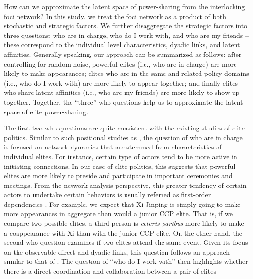 \documentclass[11pt,english]{article}
\begin{document}
\begin{flushleft}
How can we approximate the latent space of power-sharing from the interlocking foci network? In this study, we treat the foci network as a product of both stochastic and strategic factors. We further disaggregate the strategic factors into three questions: who are in charge, who do I work with, and who are my friends -- these correspond to the individual level characteristics, dyadic links, and latent affinities. Generally speaking, our approach can be summarized as follows: after controlling for random noise, powerful elites (i.e., who are in charge) are more likely to make appearances; elites who are in the same and related policy domains (i.e., who do I work with) are more likely to appear together; and finally elites who share latent affinities (i.e., who are my friends) are more likely to show up together. Together, the ``three'' who questions help us to approximate the latent space of elite power-sharing.

The first two who questions are quite consistent with the existing studies of elite politics. Similar to such positional studies as \citet{Jaros2017}, the question of who are in charge is focused on network dynamics that are stemmed from characteristics of individual elites. For instance, certain type of actors tend to be more active in initiating connections. In our case of elite politics, this suggests that powerful elites are more likely to preside and participate in important ceremonies and meetings. From the network analysis perspective, this greater tendency of certain actors to undertake certain behaviors is usually referred as first-order dependencies \citep{Kenny2006}. For example, we expect that Xi Jinping is simply going to make more appearances in aggregate than would a junior CCP elite. That is, if we compare two possible elites, a third person is \emph{ceteris paribus} more likely to make a coappearance with Xi than with the junior CCP elite. On the other hand, the second who question examines if two elites attend the same event. Given its focus on the observable direct and dyadic links, this question follows an approach similar to that of \citet{Shih2010}. The question of ``who do I work with'' then highlights whether there is a direct coordination and collaboration between a pair of elites.


\end{flushleft}
\end{document}
